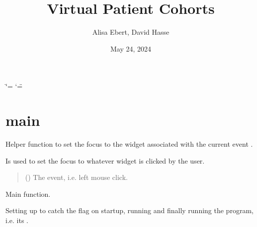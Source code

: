\documentclass[letterpaper,10pt,english]{sphinxmanual}
\title{Virtual Patient Cohorts}
\date{May 24, 2024}
\author{Alisa Ebert, David Hasse}
\begin{document}
\ifdefined\shorthandoff
  \ifnum\catcode`\=\string=\active\shorthandoff{=}\fi
  \ifnum\catcode`\"=\active{}\fi
\fi

\pagestyle{empty}
\sphinxmaketitle
\pagestyle{plain}
\sphinxtableofcontents
\pagestyle{normal}
\label{\detokenize{index::doc}}


\sphinxstepscope


\chapter{main}
\label{\detokenize{main:module-main}}\label{\detokenize{main:main}}\label{\detokenize{main::doc}}

\begin{fulllineitems}
\label{\detokenize{main:main.handle_leftclick}}
\pysigstartsignatures
{}
\pysigstopsignatures
\sphinxAtStartPar
Helper function to set the focus to the widget associated with the current event .

\sphinxAtStartPar
Is used to set the focus to whatever widget is clicked by the user.
\begin{quote}\begin{description}
\sphinxAtStartPar
{} () \textendash{} The event, i.e. left mouse click.

\end{description}\end{quote}

\end{fulllineitems}


\begin{fulllineitems}
\label{\detokenize{main:main.main}}
\pysigstartsignatures
{}
\pysigstopsignatures
\sphinxAtStartPar
Main function.

\sphinxAtStartPar
Setting up  to catch the  flag on startup, running 
and finally running the program, i.e. its .

\end{fulllineitems}
\end{document}
